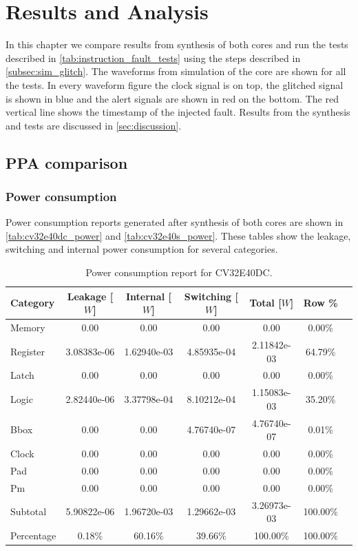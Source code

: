 \chapter{Results and Analysis}
\label{chap5}

In this chapter we compare results from synthesis of both cores and run the tests described in \autoref{tab:instruction_fault_tests} using the steps described in \autoref{subsec:sim_glitch}. The waveforms from simulation of the core are shown for all the tests. In every waveform figure the clock signal is on top, the glitched signal is shown in blue and the alert signals are shown in red on the bottom. The red vertical line shows the timestamp of the injected fault. Results from the synthesis and tests are discussed in \autoref{sec:discussion}.

\section{PPA comparison}
\label{sec:synth_comparison}

\subsection{Power consumption}
\label{subsec:power}

Power consumption reports generated after synthesis of both cores are shown in \autoref{tab:cv32e40dc_power} and \autoref{tab:cv32e40s_power}. These tables show the leakage, switching and internal power consumption for several categories. 

\begin{table}[h]
\centering
\caption{Power consumption report for CV32E40DC.}
\label{tab:cv32e40dc_power}
\begin{tabular}{l|cccccc}
\toprule
Category & Leakage [$W$] & Internal [$W$] & Switching [$W$] & Total [$W$] & Row \% \\
\midrule
\rowcolor{black!20} Memory & 0.00 & 0.00 & 0.00 & 0.00 & 0.00\% \\
Register & 3.08383e-06 & 1.62940e-03 & 4.85935e-04 & 2.11842e-03 & 64.79\% \\
\rowcolor{black!20}Latch & 0.00 & 0.00 & 0.00 & 0.00 & 0.00\% \\
Logic & 2.82440e-06 & 3.37798e-04 & 8.10212e-04 & 1.15083e-03 & 35.20\% \\
\rowcolor{black!20}Bbox & 0.00 & 0.00 & 4.76740e-07 & 4.76740e-07 & 0.01\% \\
Clock & 0.00 & 0.00 & 0.00 & 0.00 & 0.00\% \\
\rowcolor{black!20}Pad & 0.00 & 0.00 & 0.00 & 0.00 & 0.00\% \\
Pm & 0.00 & 0.00 & 0.00 & 0.00 & 0.00\% \\
\midrule
\rowcolor{black!20} Subtotal & 5.90822e-06 & 1.96720e-03 & 1.29662e-03 & 3.26973e-03 & 100.00\% \\
Percentage & 0.18\% & 60.16\% & 39.66\% & 100.00\% & 100.00\% \\
\bottomrule
\end{tabular}
\end{table}

